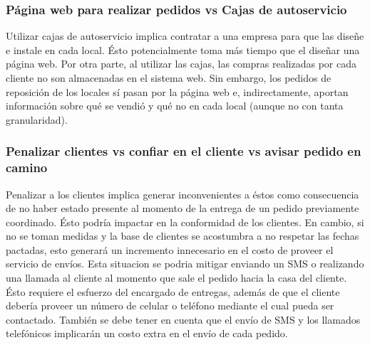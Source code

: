 \subsubsection*{Página web para realizar pedidos vs Cajas de autoservicio}

Utilizar cajas de autoservicio implica contratar a una empresa para que las diseñe e instale en cada local. Ésto potencialmente toma más tiempo que el diseñar una página web. Por otra parte, al utilizar las cajas, las compras realizadas por cada cliente no son almacenadas en el sistema web. Sin embargo, los pedidos de reposición de los locales sí pasan por la página web e, indirectamente, aportan información sobre qué se vendió y qué no en cada local (aunque no con tanta granularidad).

\subsubsection*{Penalizar clientes vs confiar en el cliente vs avisar pedido en camino}

Penalizar a los clientes implica generar inconvenientes a éstos como consecuencia de no haber estado presente al momento de la entrega de un pedido previamente coordinado. Ésto podría impactar en la conformidad de los clientes.  En cambio, si no se toman medidas y la base de clientes se acostumbra a no respetar las fechas pactadas, esto generará un incremento innecesario en el costo de proveer el servicio de envíos. Esta situacion se podria mitigar enviando un SMS o realizando una llamada al cliente al momento que sale el pedido hacia la casa del cliente. Ésto requiere el esfuerzo del encargado de entregas, además de que el cliente debería proveer un número de celular o teléfono mediante el cual pueda ser contactado. También se debe tener en cuenta que el envío de SMS y los llamados telefónicos implicarán un costo extra en el envío de cada pedido.
